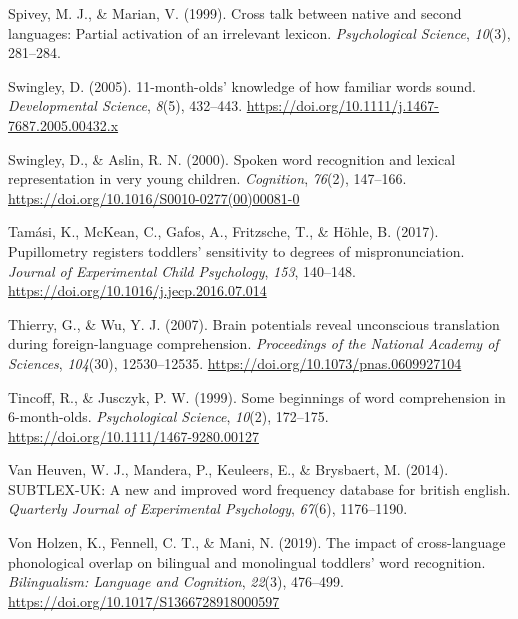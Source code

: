 \documentclass[
]{article}
\newlength{\cslhangindent}
\newlength{\cslentryspacingunit} %
\newenvironment{CSLReferences}[2] %
 {%
  \setlength{\parindent}{0pt}
  \ifodd #1
  \let\oldpar\par
  \def\par{\hangindent=\cslhangindent\oldpar}
  \fi
  \setlength{\parskip}{#2\cslentryspacingunit}
 }%
 {}
\begin{document}
\begin{CSLReferences}{1}{0}
\leavevmode{}%
Spivey, M. J., \& Marian, V. (1999). Cross talk between native and
second languages: Partial activation of an irrelevant lexicon.
\emph{Psychological Science}, \emph{10}(3), 281--284.

\leavevmode{}%
Swingley, D. (2005). 11-month-olds' knowledge of how familiar words
sound. \emph{Developmental Science}, \emph{8}(5), 432--443.
\url{https://doi.org/10.1111/j.1467-7687.2005.00432.x}

\leavevmode{}%
Swingley, D., \& Aslin, R. N. (2000). Spoken word recognition and
lexical representation in very young children. \emph{Cognition},
\emph{76}(2), 147--166.
\url{https://doi.org/10.1016/S0010-0277(00)00081-0}

\leavevmode{}%
Tamási, K., McKean, C., Gafos, A., Fritzsche, T., \& Höhle, B. (2017).
Pupillometry registers toddlers' sensitivity to degrees of
mispronunciation. \emph{Journal of Experimental Child Psychology},
\emph{153}, 140--148. \url{https://doi.org/10.1016/j.jecp.2016.07.014}

\leavevmode{}%
Thierry, G., \& Wu, Y. J. (2007). Brain potentials reveal unconscious
translation during foreign-language comprehension. \emph{Proceedings of
the National Academy of Sciences}, \emph{104}(30), 12530--12535.
\url{https://doi.org/10.1073/pnas.0609927104}

\leavevmode{}%
Tincoff, R., \& Jusczyk, P. W. (1999). Some beginnings of word
comprehension in 6-month-olds. \emph{Psychological Science},
\emph{10}(2), 172--175. \url{https://doi.org/10.1111/1467-9280.00127}

\leavevmode{}%
Van Heuven, W. J., Mandera, P., Keuleers, E., \& Brysbaert, M. (2014).
{SUBTLEX}-{UK}: A new and improved word frequency database for british
english. \emph{Quarterly Journal of Experimental Psychology},
\emph{67}(6), 1176--1190.

\leavevmode{}%
Von Holzen, K., Fennell, C. T., \& Mani, N. (2019). The impact of
cross-language phonological overlap on bilingual and monolingual
toddlers' word recognition. \emph{Bilingualism: Language and Cognition},
\emph{22}(3), 476--499. \url{https://doi.org/10.1017/S1366728918000597}


\end{CSLReferences}
\end{document}
